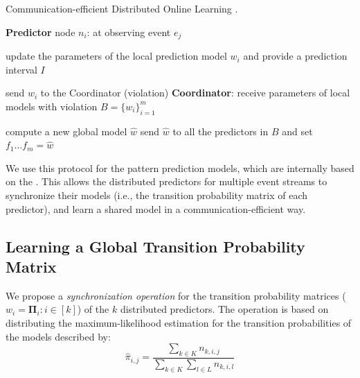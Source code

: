 \begin{algorithm}[h]
	\caption{Communication-efficient Distributed Online Learning \cite{kamp2014communication}.} 
	\begin{algorithmic}[1] 
	
		\Statex \Indm  \textbf{Predictor} node $n_i$: at observing event $e_j$
		
		\Statex \Indp update the parameters of the local prediction model $w_i$ and provide a prediction interval $I$ \;
	 

		\Statex {}  
		\Statex send  $w_i$ to the Coordinator (violation) \;
		\Statex \Indm \textbf{Coordinator}:
		\Statex \Indp receive parameters of local models with violation 
		 $B=\{w_i\}_{i=1}^m$ \;
	
	
		\Statex {}
        \Statex
		\Statex compute a new global model $\hat{w}$ \;
		\Statex send $\hat{w}$ to all the predictors in $B$ and set $f_{1}\dots f_{m}=\hat{w} $\; 
		\Statex {}
	
	\end{algorithmic}
	\label{algonline:dol}
\end{algorithm}


\par  We use this protocol for the pattern prediction models, which are internally based on the \pmcmr. This allows the distributed \pmcmr predictors for multiple event streams to synchronize their models (i.e., the transition probability matrix of each predictor), and learn a shared model in a communication-efficient way. 


\subsection*{Learning a Global Transition Probability Matrix}

\par We propose a \textit{synchronization operation} for the transition probability matrices ($w_i=\boldsymbol{\Pi}_i :i \in[k]$) of the $k$ distributed \pmcmr predictors. The operation is based on distributing the maximum-likelihood estimation \cite{anderson1957statistical} for the transition probabilities of the \pmcmr models described by:
\begin{equation}
\label{eq:dis_pi_estim}
\hat{\pi}_{i,j} = \frac{\sum_{k \in K} n_{k,i,j}}{\sum_{k \in K} \sum_{l \in L} n_{k,i,l}}
\end{equation}

